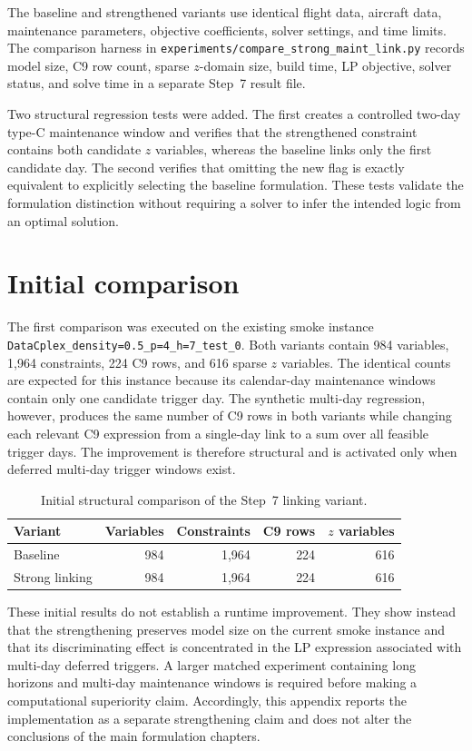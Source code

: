 The baseline and strengthened variants use identical flight data, aircraft data, maintenance parameters, objective coefficients, solver settings, and time limits. The comparison harness in \texttt{experiments/compare\_strong\_maint\_link.py} records model size, C9 row count, sparse $z$-domain size, build time, LP objective, solver status, and solve time in a separate Step~7 result file.

Two structural regression tests were added. The first creates a controlled two-day type-C maintenance window and verifies that the strengthened constraint contains both candidate $z$ variables, whereas the baseline links only the first candidate day. The second verifies that omitting the new flag is exactly equivalent to explicitly selecting the baseline formulation. These tests validate the formulation distinction without requiring a solver to infer the intended logic from an optimal solution.

\section{Initial comparison}

The first comparison was executed on the existing smoke instance
\texttt{DataCplex\_density=0.5\_p=4\_h=7\_test\_0}. Both variants contain 984 variables, 1,964 constraints, 224 C9 rows, and 616 sparse $z$ variables. The identical counts are expected for this instance because its calendar-day maintenance windows contain only one candidate trigger day. The synthetic multi-day regression, however, produces the same number of C9 rows in both variants while changing each relevant C9 expression from a single-day link to a sum over all feasible trigger days. The improvement is therefore structural and is activated only when deferred multi-day trigger windows exist.

\begin{table}[htbp]
\centering
\caption{Initial structural comparison of the Step~7 linking variant.}
\label{tab:step7_structure}
\begin{tabular}{lrrrr}
\toprule
Variant & Variables & Constraints & C9 rows & $z$ variables \\
\midrule
Baseline & 984 & 1,964 & 224 & 616 \\
Strong linking & 984 & 1,964 & 224 & 616 \\
\bottomrule
\end{tabular}
\end{table}

These initial results do not establish a runtime improvement. They show instead that the strengthening preserves model size on the current smoke instance and that its discriminating effect is concentrated in the LP expression associated with multi-day deferred triggers. A larger matched experiment containing long horizons and multi-day maintenance windows is required before making a computational superiority claim. Accordingly, this appendix reports the implementation as a separate strengthening claim and does not alter the conclusions of the main formulation chapters.

